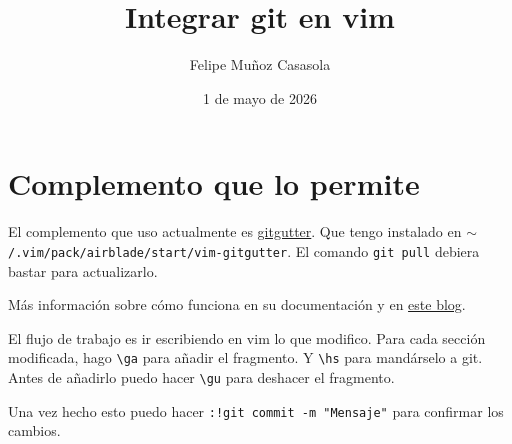 \documentclass{article}
\title{Integrar git en vim}
\author{Felipe Muñoz Casasola}
\date{1 de mayo de 2026}
\begin{document}
    \maketitle
    \clearpage
    \section{Complemento que lo permite}
    El complemento que uso actualmente es \href{https://github.com/airblade/vim-gitgutter}
    {gitgutter}. Que tengo instalado en \texttt{$\sim$/.vim/\-pack/\-airblade/\-start/\-vim-gitgutter}.
    El comando \texttt{git pull} debiera bastar para actualizarlo.

    Más información sobre cómo funciona en su documentación y en
    \href{https://jakobgm.com/posts/vim/git-integration/}{este blog}.

    El flujo de trabajo es ir escribiendo en vim lo que modifico. Para cada
    sección modificada, hago \texttt{\textbackslash ga} para añadir el fragmento. Y \texttt{\textbackslash hs}
    para mandárselo a git. Antes de añadirlo puedo hacer \texttt{\textbackslash gu} para deshacer
    el fragmento.

    Una vez hecho esto puedo hacer \texttt{:!git commit -m "Mensaje"} para confirmar
    los cambios.
\end{document}
